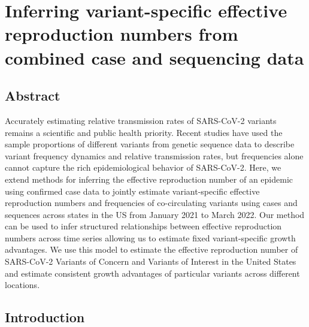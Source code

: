 \graphicspath{{./chapters/rt-from-frequency-dynamics/}}
\chapter{Inferring variant-specific effective reproduction numbers from combined case and sequencing data}


\section{Abstract}
Accurately estimating relative transmission rates of SARS-CoV-2 variants remains a scientific and public health priority.
Recent studies have used the sample proportions of different variants from genetic sequence data to describe variant frequency dynamics and relative transmission rates, but frequencies alone cannot capture the rich epidemiological behavior of SARS-CoV-2.
Here, we extend methods for inferring the effective reproduction number of an epidemic using confirmed case data to jointly estimate variant-specific effective reproduction numbers and frequencies of co-circulating variants using cases and sequences across states in the US from January 2021 to March 2022.
Our method can be used to infer structured relationships between effective reproduction numbers across time series allowing us to estimate fixed variant-specific growth advantages.
We use this model to estimate the effective reproduction number of SARS-CoV-2 Variants of Concern and Variants of Interest in the United States and estimate consistent growth advantages of particular variants across different locations.

\section{Introduction}

